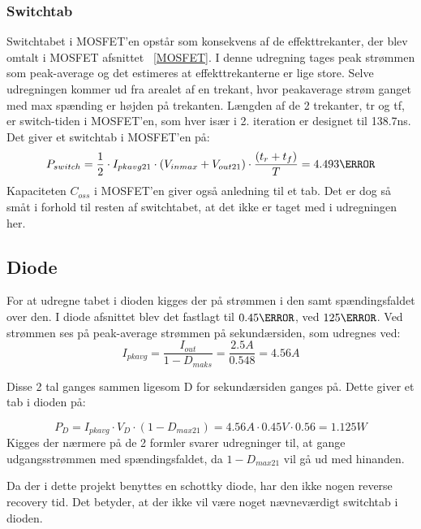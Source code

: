 \subsubsection{Switchtab} \label{switchtab2}
Switchtabet i MOSFET'en opstår som konsekvens af de effekttrekanter, der blev omtalt i MOSFET afsnittet ~\ref{MOSFET}. I denne udregning tages peak strømmen som peak-average og det estimeres at effekttrekanterne er lige store. Selve udregningen kommer ud fra arealet af en trekant, hvor peakaverage strøm ganget med max spænding er højden på trekanten. Længden af de 2 trekanter, tr og tf, er switch-tiden i MOSFET'en, som hver især i 2. iteration er designet til 138.7ns. Det giver et switchtab i MOSFET'en på:
 \begin{equation} \label{P_switch}
 P_{switch} = \frac{1}{2} \cdot I_{pkavg21} \cdot (V_{inmax}+V_{out21}) \cdot \frac{(t_r+t_f)}{T}= 4.493\watt
 \end{equation} 
Kapaciteten $C_{oss}$ i MOSFET'en giver også anledning til et tab. Det er dog så småt i forhold til resten af switchtabet, at det ikke er taget med i udregningen her. 

\subsection{Diode}
For at udregne tabet i dioden kigges der på strømmen i den samt spændingsfaldet over den. I diode afsnittet blev det fastlagt til $0.45\ohm$, ved $125\degreeCelsius$. Ved strømmen ses på peak-average strømmen på sekundærsiden, som udregnes ved:
\begin{equation} \label{I_pk_avg}
I_{pkavg} = \frac{I_{out}}{1-D_{maks}} = \frac{2.5A}{0.548} = 4.56A
\end{equation}

\noindent Disse 2 tal ganges sammen ligesom D for sekundærsiden ganges på. Dette giver et tab i dioden på:

\begin{equation} \label{diodetab}
P_D = I_{pkavg} \cdot V_D \cdot (1-D_{max21}) = 4.56A \cdot 0.45V \cdot 0.56 = 1.125W 
\end{equation}  
Kigges der nærmere på de 2 formler svarer udregninger til, at gange udgangsstrømmen med spændingsfaldet, da $1-D_{max21}$ vil gå ud med hinanden.

\noindent Da der i dette projekt benyttes en schottky diode, har den ikke nogen reverse recovery tid. Det betyder, at der ikke vil være noget nævneværdigt switchtab i dioden. 

